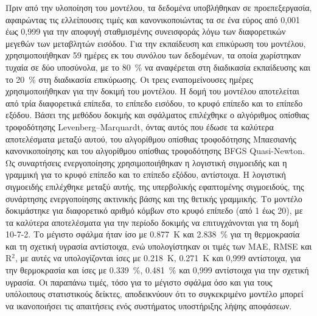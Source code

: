 \documentclass[12pt, a4paper]{report} %
\newcommand{\english}{\foreignlanguage{english}}
\begin{document}
Πριν από την υλοποίηση του μοντέλου, τα δεδομένα υποβλήθηκαν σε προεπεξεργασία, αφαιρώντας τις ελλείπουσες τιμές και 
κανονικοποιώντας τα σε ένα εύρος από 0,001 έως 0,999 για την αποφυγή σταθμισμένης συνεισφοράς λόγω των διαφορετικών 
μεγεθών των μεταβλητών εισόδου. Για την εκπαίδευση και επικύρωση του μοντέλου, χρησιμοποιήθηκαν 59 ημέρες εκ του συνόλου 
των δεδομένων, τα οποία χωρίστηκαν τυχαία σε δύο υποσύνολα, με το \SI{80}{\percent} να αναφέρεται στη διαδικασία 
εκπαίδευσης και το \SI{20}{\percent} στη διαδικασία επικύρωσης. Οι τρεις εναπομείνουσες ημέρες χρησιμοποιήθηκαν για την 
δοκιμή του μοντέλου. Η δομή του μοντέλου αποτελείται από τρία διαφορετικά επίπεδα, το επίπεδο εισόδου, το κρυφό επίπεδο 
και το επίπεδο εξόδου. Βάσει της μεθόδου δοκιμής και σφάλματος επιλέχθηκε ο αλγόριθμος οπίσθιας τροφοδότησης 
\english{Levenberg–Marquardt}, όντας αυτός που έδωσε τα καλύτερα αποτελέσματα μεταξύ αυτού, του αλγορίθμου οπίσθιας 
τροφοδότησης Μπαεσιανής κανονικοποίησης και του αλγορίθμου οπίσθιας τροφοδότησης \english{BFGS Quasi-Newton}. Ως 
συναρτήσεις ενεργοποίησης χρησιμοποιήθηκαν η λογιστική σιγμοειδής και η γραμμική για το κρυφό επίπεδο και το επίπεδο 
εξόδου, αντίστοιχα. Η λογιστική σιγμοειδής επιλέχθηκε μεταξύ αυτής, της υπερβολικής εφαπτομένης σιγμοειδούς, της 
συνάρτησης ενεργοποίησης ακτινικής βάσης και της θετικής γραμμικής. Το μοντέλο δοκιμάστηκε για διαφορετικό αριθμό κόμβων 
στο κρυφό επίπεδο (από 1 έως 20), με τα καλύτερα αποτελέσματα για την περίοδο δοκιμής να επιτυγχάνονται για τη δομή 
10-7-2. Το μέγιστο σφάλμα ήταν ίσο με \SI{0,877}{\kelvin} και \SI{2,838}{\percent} για τη θερμοκρασία και τη σχετική 
υγρασία αντίστοιχα, ενώ υπολογίστηκαν οι τιμές των \english{MAE}, \english{RMSE} και \english{R$^2$}, με αυτές να 
υπολογίζονται ίσες με \SI{0,218}{\kelvin}, \SI{0,271}{\kelvin} και 0,999 αντίστοιχα, για την θερμοκρασία και ίσες με 
\SI{0,339}{\percent}, \SI{0,481}{\percent} και 0,999 αντίστοιχα για την σχετική υγρασία. Οι παραπάνω τιμές, τόσο για 
το μέγιστο σφάλμα όσο και για τους υπόλοιπους στατιστικούς δείκτες, αποδεικνύουν ότι το συγκεκριμένο μοντέλο μπορεί να 
ικανοποιήσει τις απαιτήσεις ενός συστήματος υποστήριξης λήψης αποφάσεων.
\end{document}
